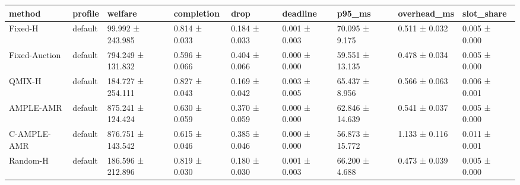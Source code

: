 \begin{tabular}{lllllllll}
\toprule
method & profile & welfare & completion & drop & deadline & p95\_ms & overhead\_ms & slot\_share \\
\midrule
Fixed-H & default & 99.992 ± 243.985 & 0.814 ± 0.033 & 0.184 ± 0.033 & 0.001 ± 0.003 & 70.095 ± 9.175 & 0.511 ± 0.032 & 0.005 ± 0.000 \\
Fixed-Auction & default & 794.249 ± 131.832 & 0.596 ± 0.066 & 0.404 ± 0.066 & 0.000 ± 0.000 & 59.551 ± 13.135 & 0.478 ± 0.034 & 0.005 ± 0.000 \\
QMIX-H & default & 184.727 ± 254.111 & 0.827 ± 0.043 & 0.169 ± 0.042 & 0.003 ± 0.005 & 65.437 ± 8.956 & 0.566 ± 0.063 & 0.006 ± 0.001 \\
AMPLE-AMR & default & 875.241 ± 124.424 & 0.630 ± 0.059 & 0.370 ± 0.059 & 0.000 ± 0.000 & 62.846 ± 14.639 & 0.541 ± 0.037 & 0.005 ± 0.000 \\
C-AMPLE-AMR & default & 876.751 ± 143.542 & 0.615 ± 0.046 & 0.385 ± 0.046 & 0.000 ± 0.000 & 56.873 ± 15.772 & 1.133 ± 0.116 & 0.011 ± 0.001 \\
Random-H & default & 186.596 ± 212.896 & 0.819 ± 0.030 & 0.180 ± 0.030 & 0.001 ± 0.003 & 66.200 ± 4.688 & 0.473 ± 0.039 & 0.005 ± 0.000 \\
\bottomrule
\end{tabular}
